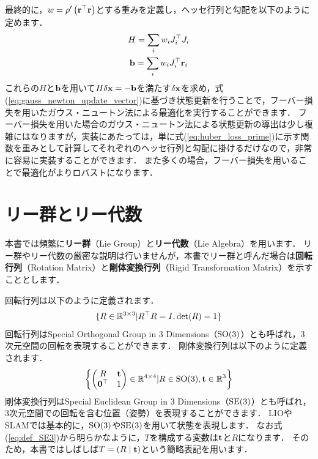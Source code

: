 最終的に，$w = \rho^{\prime} \left( {\bf r}^{\top} {\bf r} \right)$とする重みを定義し，ヘッセ行列と勾配を以下のように定めます．
%
\begin{align}
  \begin{gathered}
    H = \sum_{i} w_{i} J_{i}^{\top} J_{i} \\
    {\bf b} = \sum_{i} w_{i} J_{i}^{\top} {\bf r}_{i}
  \end{gathered}
  \label{eq:hessian_and_gradient_gauss_newton_huber_loss_weight}
\end{align}
%
これらの$H$と${\bf b}$を用いて$H \delta {\bf x} = -{\bf b}$を満たす$\delta {\bf x}$を求め，式(\ref{eq:gauss_newton_update_vector})に基づき状態更新を行うことで，フーバー損失を用いたガウス・ニュートン法による最適化を実行することができます．
フーバー損失を用いた場合のガウス・ニュートン法による状態更新の導出は少し複雑にはなりますが，実装にあたっては，単に式(\ref{eq:huber_loss_prime})に示す関数を重みとして計算してそれぞれのヘッセ行列と勾配に掛けるだけなので，非常に容易に実装することができます．
また多くの場合，フーバー損失を用いることで最適化がよりロバストになります．
















\section{リー群とリー代数}

本書では頻繁に{\bf リー群}（Lie Group）と{\bf リー代数}（Lie Algebra）を用います．
リー群やリー代数の厳密な説明は行いませんが，本書でリー群と呼んだ場合は{\bf 回転行列}（Rotation Matrix）と{\bf 剛体変換行列}（Rigid Transformation Matrix）を示すこととします．

回転行列は以下のように定義されます．
%
\begin{align}
  \{R \in \mathbb{R}^{3 \times 3} | R^{\top} R = I, {\rm det}(R) = 1\}
  \label{eq:def_SO3}
\end{align}
%
回転行列はSpecial Orthogonal Group in 3 Dimensions（${\rm SO}(3)$）とも呼ばれ，3次元空間の回転を表現することができます．
剛体変換行列は以下のように定義されます．
%
\begin{align}
  \left\{ \left( \begin{matrix} R & {\bf t} \\ {\bf 0}^{\top} & 1 \end{matrix} \right) \in \mathbb{R}^{4 \times 4} | R \in {\rm SO}(3), {\bf t} \in \mathbb{R}^{3} \right\}
  \label{eq:def_SE3}
\end{align}
%
剛体変換行列はSpecial Euclidean Group in 3 Dimensions（${\rm SE}(3)$）とも呼ばれ，3次元空間での回転を含む位置（姿勢）を表現することができます．
LIOやSLAMでは基本的に，${\rm SO}(3)$や${\rm SE}(3)$を用いて状態を表現します．
なお式(\ref{eq:def_SE3})から明らかなように，$T$を構成する変数は${\bf t}$と$R$になります．
そのため，本書ではしばしば$T = \left( R \mid {\bf t} \right)$という簡略表記を用います．

